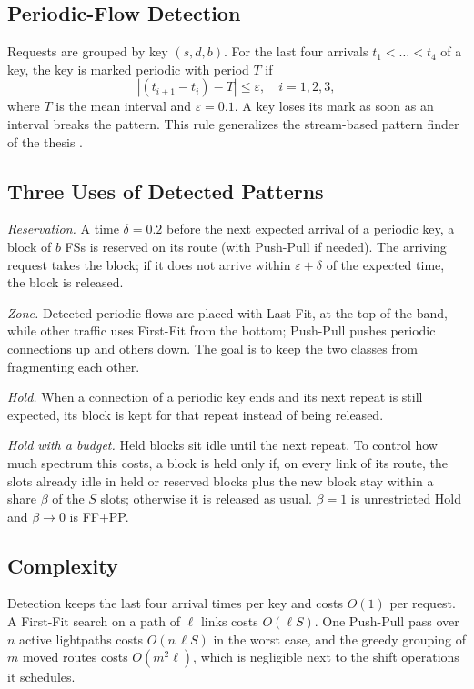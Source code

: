 \documentclass[conference]{IEEEtran}
\begin{document}
\subsection{Periodic-Flow Detection}
Requests are grouped by key $(s,d,b)$. For the last four arrivals $t_1<\dots<t_4$ of a key, the key is marked periodic with period $T$ if
\begin{equation}
\left| (t_{i+1}-t_i) - T \right| \le \varepsilon,\quad i=1,2,3,
\end{equation}
where $T$ is the mean interval and $\varepsilon=0.1$. A key loses its mark as soon as an interval breaks the pattern. This rule generalizes the stream-based pattern finder of the thesis \cite{malayeri2022}.

\subsection{Three Uses of Detected Patterns}
\textit{Reservation.} A time $\delta=0.2$ before the next expected arrival of a periodic key, a block of $b$ FSs is reserved on its route (with Push-Pull if needed). The arriving request takes the block; if it does not arrive within $\varepsilon+\delta$ of the expected time, the block is released.

\textit{Zone.} Detected periodic flows are placed with Last-Fit, at the top of the band, while other traffic uses First-Fit from the bottom; Push-Pull pushes periodic connections up and others down. The goal is to keep the two classes from fragmenting each other.

\textit{Hold.} When a connection of a periodic key ends and its next repeat is still expected, its block is kept for that repeat instead of being released.

\textit{Hold with a budget.} Held blocks sit idle until the next repeat. To control how much spectrum this costs, a block is held only if, on every link of its route, the slots already idle in held or reserved blocks plus the new block stay within a share $\beta$ of the $S$ slots; otherwise it is released as usual. $\beta=1$ is unrestricted Hold and $\beta\to 0$ is FF+PP.

\subsection{Complexity}
Detection keeps the last four arrival times per key and costs $O(1)$ per request. A First-Fit search on a path of $\ell$ links costs $O(\ell S)$. One Push-Pull pass over $n$ active lightpaths costs $O(n\,\ell S)$ in the worst case, and the greedy grouping of $m$ moved routes costs $O(m^2\ell)$, which is negligible next to the shift operations it schedules.
\end{document}
